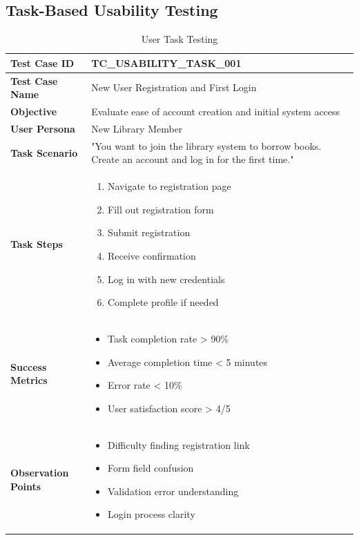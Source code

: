 \documentclass[12pt,a4paper]{article}
\begin{document}
\subsection{Task-Based Usability Testing}

\begin{longtable}{|p{3cm}|p{12cm}|}
\caption{User Task Testing} \\
\hline
\rowcolor{lightgray}
\textbf{Test Case ID} & \textbf{TC\_USABILITY\_TASK\_001} \\
\hline
\textbf{Test Case Name} & New User Registration and First Login \\
\hline
\textbf{Objective} & Evaluate ease of account creation and initial system access \\
\hline
\textbf{User Persona} & New Library Member \\
\hline
\textbf{Task Scenario} & 
"You want to join the library system to borrow books. Create an account and log in for the first time." \\
\hline
\textbf{Task Steps} & 
\begin{enumerate}[nosep]
    \item Navigate to registration page
    \item Fill out registration form
    \item Submit registration
    \item Receive confirmation
    \item Log in with new credentials
    \item Complete profile if needed
\end{enumerate} \\
\hline
\textbf{Success Metrics} & 
\begin{itemize}[nosep]
    \item Task completion rate > 90\%
    \item Average completion time < 5 minutes
    \item Error rate < 10\%
    \item User satisfaction score > 4/5
\end{itemize} \\
\hline
\textbf{Observation Points} & 
\begin{itemize}[nosep]
    \item Difficulty finding registration link
    \item Form field confusion
    \item Validation error understanding
    \item Login process clarity
\end{itemize} \\
\hline
\end{longtable}
\end{document}

